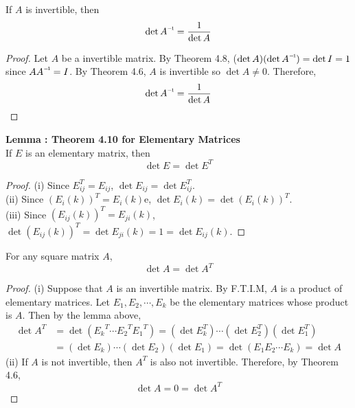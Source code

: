 \begin{theorem}
	If $ A $ is invertible, then $$ \det\inv{A} = \dfrac{1}{\det A}$$
\end{theorem}
\begin{proof}
	Let $A$ be a invertible matrix. By Theorem 4.8, ($\det{A})(\det{\inv{A}}) = \det{I} = 1$ since $A\inv{A} = I$. By Theorem 4.6, $A$ is invertible so $\det{A} \neq 0$. Therefore, \begin{equation*}
		\det{\inv{A}} = \frac{1}{\det{A}}
	\end{equation*}
\end{proof}

\textbf{Lemma : Theorem 4.10 for Elementary Matrices} \\
If $E$ is an elementary matrix, then \begin{equation*}
	\det{E} = \det{E^T}
\end{equation*}

\begin{proof}
	(i) Since $E_{ij}^T = E_{ij}$, $\det{E_{ij}} = \det{E_{ij}^T}$. \\
	
	(ii) Since $(E_{i}(k))^T = E_i(k)$e, $\det{E_{i}(k)} = \det{(E_{i}(k))^T}$. \\
	
	(iii) Since $(E_{ij}(k))^T = E_{ji}(k)$, $\det{(E_{ij}(k))^T} = \det{E_{ji}(k)} = 1 = \det{E_{ij}(k)}$.
\end{proof}

\begin{theorem}
	For any square matrix $ A $, $$ \det A = \det A^{T} $$
\end{theorem}
\begin{proof}
	(i) Suppose that $A$ is an invertible matrix. By F.T.I.M, $A$ is a product of elementary matrices. Let $E_1, E_2, \cdots, E_k$ be the elementary matrices whose product is $A$. Then by the lemma above, \begin{align*}
		\det{A^T} &= \det{({E_k}^T\cdots {E_2}^T{E_1}^T)} = (\det{E_k^T})\cdots(\det{E_2^T})(\det{E_1^T}) \\
		&= (\det{E_k})\cdots(\det{E_2})(\det{E_1}) = \det{(E_1E_2\cdots E_k)} = \det{A}
	\end{align*}
	(ii) If $A$ is not invertible, then $A^T$ is also not invertible. Therefore, by Theorem 4.6, \begin{equation*}
		\det{A} = 0 = \det{A^T}
	\end{equation*}
\end{proof}

